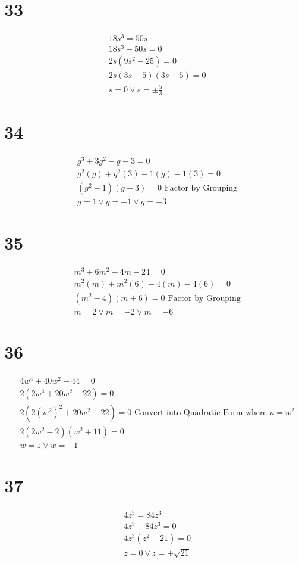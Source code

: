 \documentclass{article}
\theoremstyle{definition}
\begin{document}
\section*{33}
\[
\begin{array}{rl}
	& 18s^3=50s \\
	& 18s^3-50s=0 \\
	& 2s(9s^2-25)=0 \\
	& 2s(3s+5)(3s-5)=0 \\
	& s=0\vee s=\pm\frac{5}{3}
\end{array}
\]

\section*{34}
\[
\begin{array}{rl}
	& g^3+3g^2-g-3=0 \\
	& g^2(g)+g^2(3)-1(g)-1(3)=0 \\
	& (g^2-1)(g+3)=0\textrm{ Factor by Grouping}\\
	& g=1\vee g=-1\vee g=-3
\end{array}
\]

\section*{35}
\[
\begin{array}{rl}
	& m^3+6m^2-4m-24=0 \\
	& m^2(m)+m^2(6)-4(m)-4(6)=0 \\
	& (m^2-4)(m+6)=0\textrm{ Factor by Grouping}\\
	& m=2\vee m=-2\vee m=-6
\end{array}
\]

\section*{36}
\[
\begin{array}{rl}
	& 4w^4+40w^2-44=0 \\
	& 2(2w^4+20w^2-22)=0 \\
	& 2(2(w^2)^2+20w^2-22)=0\textrm{ Convert into Quadratic Form where $u=w^2$} \\
	& 2(2w^2-2)(w^2+11)=0 \\
	& w=1\vee w=-1
\end{array}
\]

\section*{37}
\[
\begin{array}{rl}
	& 4z^5=84z^3 \\
	& 4z^5-84z^3=0 \\
	& 4z^3(z^2+21)=0 \\
	& z=0\vee z=\pm\sqrt{21}
\end{array}
\]
\end{document}
